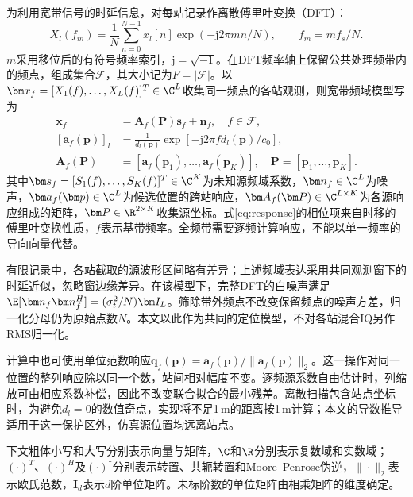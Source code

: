 为利用宽带信号的时延信息，对每站记录作离散傅里叶变换（DFT）：
\begin{equation}
 X_l(f_m)=\frac1N\sum_{n=0}^{N-1}x_l[n]
 \exp(-\mathrm j2\pi mn/N),\qquad f_m=mf_s/N .\label{eq:dft}
\end{equation}
$m$采用移位后的有符号频率索引，$\mathrm j=\sqrt{-1}$。在DFT频率轴上保留公共处理频带内的频点，组成集合$\mathcal F$，其大小记为$F=|\mathcal F|$。以$\bm x_f=[X_1(f),\ldots,X_L(f)]^T\in\C^L$收集同一频点的各站观测，则宽带频域模型写为\cite{ChenHudsonYao2002}
\begin{align}
 \bm x_f&=\bm A_f(\bm P)\bm s_f+\bm n_f,\quad f\in\mathcal F,\label{eq:frequency}\\
 [\bm a_f(\bm p)]_l&=\frac{1}{d_l(\bm p)}
       \exp[-\mathrm j2\pi f d_l(\bm p)/c_0],\label{eq:response}\\
 \bm A_f(\bm P)&=[\bm a_f(\bm p_1),\ldots,\bm a_f(\bm p_K)],\quad
 \bm P=[\bm p_1,\ldots,\bm p_K].\nonumber
\end{align}
其中$\bm s_f=[S_1(f),\ldots,S_K(f)]^T\in\C^K$为未知源频域系数，$\bm n_f\in\C^L$为噪声，$\bm a_f(\bm p)\in\C^L$为候选位置的跨站响应，$\bm A_f(\bm P)\in\C^{L\times K}$为各源响应组成的矩阵，$\bm P\in\R^{2\times K}$收集源坐标。式\eqref{eq:response}的相位项来自时移的傅里叶变换性质，$f$表示基带频率。全频带需要逐频计算响应，不能以单一频率的导向向量代替。

有限记录中，各站截取的源波形区间略有差异；上述频域表达采用共同观测窗下的时延近似，忽略窗边缘差异。在该模型下，完整DFT的白噪声满足$\E[\bm n_f\bm n_f^H]=(\sigma_t^2/N)\bm I_L$。筛除带外频点不改变保留频点的噪声方差，归一化分母仍为原始点数$N$。本文以此作为共同的定位模型，不对各站混合IQ另作RMS归一化。

计算中也可使用单位范数响应$\bm q_f(\bm p)=\bm a_f(\bm p)/\|\bm a_f(\bm p)\|_2$。这一操作对同一位置的整列响应除以同一个数，站间相对幅度不变。逐频源系数自由估计时，列缩放可由相应系数补偿，因此不改变联合拟合的最小残差。离散扫描包含站点坐标时，为避免$d_l=0$的数值奇点，实现将不足1\,m的距离按1\,m计算；本文的导数推导适用于这一保护区外，仿真源位置均远离站点。

下文粗体小写和大写分别表示向量与矩阵，$\C$和$\R$分别表示复数域和实数域；$(\cdot)^T$、$(\cdot)^H$及$(\cdot)^\dagger$分别表示转置、共轭转置和Moore--Penrose伪逆，$\|\cdot\|_2$表示欧氏范数，$\bm I_d$表示$d$阶单位矩阵。未标阶数的单位矩阵由相乘矩阵的维度确定。

